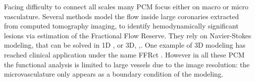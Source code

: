 \documentclass[journal]{IEEEtran}
\begin{document}

  
Facing difficulty to connect all scales many PCM focus either on macro or micro vasculature. 
Several methods model the flow inside large coronaries extracted from computed tomography imaging, to identify hemodynamically significant lesions via estimation of the Fractional Flow Reserve. They rely on Navier-Stokes modeling, that can be solved in 1D \cite{fossan2018uncertainty}, or 3D, \cite{kim2010patient},\cite{chung2017diagnostic}. One example of 3D modeling has reached clinical application under the name FFRct \cite{taylor2013computational}. However in all these PCM the functional analysis is limited to large vessels due to the image resolution: the microvasculature only appears as a boundary condition of the modeling.


\end{document}
